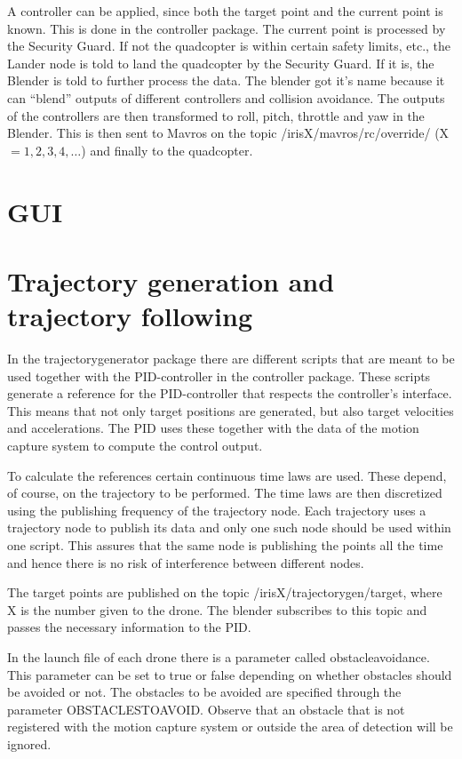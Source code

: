 \documentclass[titlepage,11pt,a4paper]{article}
\begin{document}
A controller can be applied, since both the target point and the
current point is known. This is done in the controller package. The
current point is processed by the Security Guard. If not the
quadcopter is within certain safety limits, etc., the Lander node is
told to land the quadcopter by the Security Guard. If it is, the
Blender is told to further process the data. The blender got it's name
because it can ``blend'' outputs of different controllers and
collision avoidance. The outputs of the controllers are then
transformed to roll, pitch, throttle and yaw in the
Blender. This is then sent to Mavros on the topic
/irisX/mavros/rc/override/ (X $= 1, 2, 3, 4, \dots$) and finally to the
quadcopter.


\section{GUI}
\label{sec:gui}

\section{Trajectory generation and trajectory following}
\label{sec:trajectory}

In the trajectory\textunderscore generator package there are different scripts that are meant to be used together with the PID-controller in the controller package. These scripts generate a reference for the PID-controller that respects the controller's interface. This means that not only target positions are generated, but also target velocities and accelerations. The PID uses these together with the data of the motion capture system to compute the control output. 

To calculate the references certain continuous time laws are used. These depend, of course, on the trajectory to be performed. The time laws are then discretized using the publishing frequency of the trajectory node. Each trajectory uses a trajectory node to publish its data and only one such node should be used within one script. This assures that the same node is publishing the points all the time and hence there is no risk of interference between different nodes. 

The target points are published on the topic /irisX/trajectory\textunderscore gen/target, where X is the number given to the drone. The blender subscribes to this topic and passes the necessary information to the PID.

In the launch file of each drone there is a parameter called obstacle\textunderscore avoidance. This parameter can be set to true or false depending on whether obstacles should be avoided or not. The obstacles to be avoided are specified through the parameter OBSTACLES\textunderscore TO\textunderscore AVOID. Observe that an obstacle that is not registered with the motion capture system or outside the area of detection will be ignored.
\end{document}
